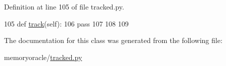 Definition at line 105 of file tracked.\+py.


\begin{DoxyCode}
105     \textcolor{keyword}{def }\hyperlink{classmemoryoracle_1_1tracked_1_1UntrackedDecorator_af480ef42d03cf8351c201e3f726ff8d2}{track}(self):
106         \textcolor{keywordflow}{pass}
107 
108 
109 \end{DoxyCode}


The documentation for this class was generated from the following file\+:\begin{DoxyCompactItemize}
\item 
memoryoracle/\hyperlink{tracked_8py}{tracked.\+py}\end{DoxyCompactItemize}
